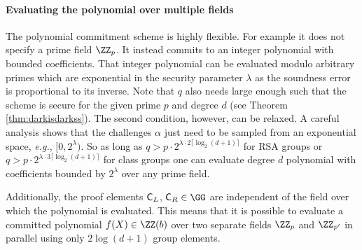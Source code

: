 \paragraph{Evaluating the polynomial over multiple fields}
The polynomial commitment scheme is highly flexible. For example it does not specify a prime field $\ZZ_p$. It instead commits to an integer polynomial with bounded coefficients. That integer polynomial can be evaluated modulo arbitrary primes which are exponential in the security parameter $\lambda$ as the soundness error is proportional to its inverse.
Note that $q$ also needs large enough such that the scheme is secure for the given prime $p$ and degree $d$ (see Theorem \ref{thm:darkisdarkss}). The second condition, however, can be relaxed. A careful analysis shows that the challenges $\alpha$ just need to be sampled from an exponential space, \emph{e.g.}, $[0,2^{\lambda})$. So as long as $q>p \cdot 2^{\lambda\cdot 2\lceil \log_2(d+1)\rceil}$ for RSA groups or  $q>p \cdot 2^{\lambda \cdot 3\lceil \log_2(d+1)\rceil}$ for class groups one can evaluate degree $d$ polynomial with coefficients bounded by $2^\lambda$ over any prime field.

Additionally, the proof elements $\gr{C}_L$, $\gr{C}_R \in \GG$ are independent of the field over which the polynomial is evaluated. This means that it is possible to evaluate a committed polynomial $f(X) \in \ZZ(b)$ over two separate fields $\ZZ_{p}$ and $\ZZ_{p'}$ in parallel using only $2\log(d+1)$ group elements. 



